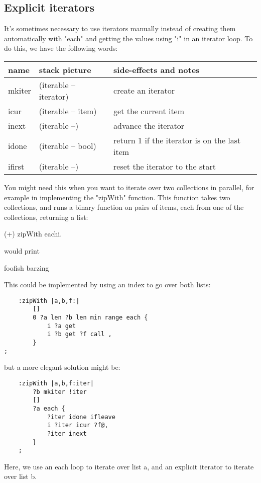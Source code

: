 \subsection{Explicit iterators}
It's sometimes necessary to use iterators manually instead of creating
them automatically with "each" and getting the values using "i" in an
iterator loop.
To do this, we have the following words:
\begin{center}
\begin{tabular}{|l|l|p{4in}|}\hline
\textbf{name} & \textbf{stack picture} & \textbf{side-effects and notes}\\ \hline
mkiter & (iterable -- iterator) & create an iterator\\
icur & (iterable -- item) & get the current item\\
inext & (iterable --) & advance the iterator\\
idone & (iterable -- bool) & return 1 if the iterator is on the last item\\
ifirst & (iterable --) & reset the iterator to the start\\
\hline
\end{tabular}
\end{center}


You might need this when you want to iterate over
two collections in parallel, for example in implementing the "zipWith"
function. This function takes two collections, and runs a binary function on
pairs of items, each from one of the collections, returning a list:

\begin{v}
     (+) zipWith each{i.}
\end{v}
\noindent would print
\begin{v}
    foofish
    barzing
\end{v}
This could be implemented by using an index to go over both lists:

\begin{lstlisting}
    :zipWith |a,b,f:|
        []
        0 ?a len ?b len min range each {
            i ?a get 
            i ?b get ?f call ,
        }
;
\end{lstlisting}
but a more elegant solution might be:
\begin{lstlisting}
    :zipWith |a,b,f:iter|
        ?b mkiter !iter
        []
        ?a each {
            ?iter idone ifleave
            i ?iter icur ?f@,
            ?iter inext 
        }
    ;
\end{lstlisting}
Here, we use an each loop to iterate over list a, and an explicit
iterator to iterate over list b.


